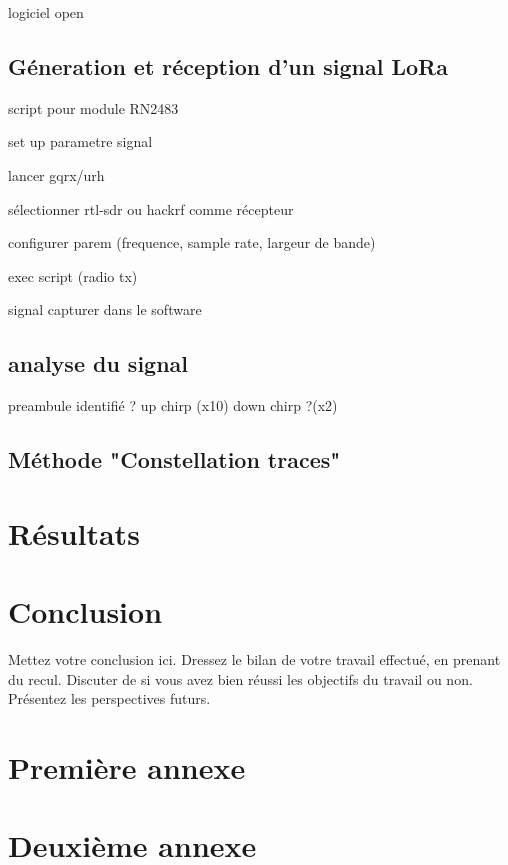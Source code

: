 \documentclass[12pt,a4paper,oneside, titlepage]{report}
\begin{document}
logiciel open

\section{Géneration et réception d'un signal LoRa}

script pour module RN2483

set up parametre signal

lancer gqrx/urh

sélectionner rtl-sdr ou hackrf comme récepteur

configurer parem (frequence, sample rate, largeur de bande)

exec script (radio tx)

signal capturer dans le software

\section{analyse du signal}

preambule identifié ? up chirp (x10) down chirp ?(x2)

\section{Méthode "Constellation traces"}

\chapter{Résultats}





\chapter*{Conclusion}
\renewcommand{\leftmark}{CONCLUSION}

Mettez votre conclusion ici.  Dressez le bilan de votre travail effectué, en prenant du recul. Discuter de si vous avez bien réussi les objectifs du travail ou non. Présentez les perspectives futurs.






\newpage
\appendix
{}

\chapter{Premi\`ere annexe}
\renewcommand{\leftmark}{ANNEXE \thechapter.~~Premi\`ere annexe}
\label{annexe1}

\chapter{Deuxi\`eme annexe}
\renewcommand{\leftmark}{ANNEXE \thechapter.~~Deuxi\`eme annexe}
\label{annexe2}

\end{document}
